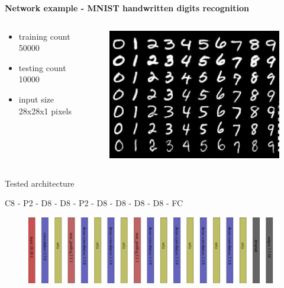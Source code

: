 \documentclass[xcolor=dvipsnames]{beamer}
\begin{document}
\begin{frame}{\bf Network example - MNIST handwritten digits recognition}



\begin{columns}
\begin{column}{0.5\textwidth}

\begin{itemize}
  \item training count 50000
  \item testing count 10000
  \item input size 28x28x1 pixels
\end{itemize}

\end{column}
\begin{column}{0.5\textwidth}  %

\begin{figure}
  \includegraphics[scale=0.2]{../pictures/mnist.jpg}
\end{figure}

\end{column}
\end{columns}

Tested architecture

C8 - P2 - D8 - D8 - P2 - D8 - D8 - D8 - D8 - FC

\begin{figure}
  \includegraphics[scale=0.14]{../diagrams/cnn_architecture.png}
\end{figure}

\end{frame}
\end{document}
